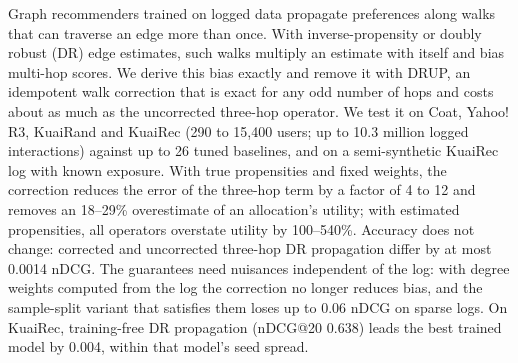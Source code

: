 Graph recommenders trained on logged data propagate preferences along walks that can traverse an edge more than once. With inverse-propensity or doubly robust (DR) edge estimates, such walks multiply an estimate with itself and bias multi-hop scores. We derive this bias exactly and remove it with DRUP, an idempotent walk correction that is exact for any odd number of hops and costs about as much as the uncorrected three-hop operator. We test it on Coat, Yahoo! R3, KuaiRand and KuaiRec (290 to 15,400 users; up to 10.3 million logged interactions) against up to 26 tuned baselines, and on a semi-synthetic KuaiRec log with known exposure. With true propensities and fixed weights, the correction reduces the error of the three-hop term by a factor of 4 to 12 and removes an 18--29\% overestimate of an allocation's utility; with estimated propensities, all operators overstate utility by 100--540\%. Accuracy does not change: corrected and uncorrected three-hop DR propagation differ by at most 0.0014 nDCG. The guarantees need nuisances independent of the log: with degree weights computed from the log the correction no longer reduces bias, and the sample-split variant that satisfies them loses up to 0.06 nDCG on sparse logs. On KuaiRec, training-free DR propagation (nDCG@20 0.638) leads the best trained model by 0.004, within that model's seed spread.
